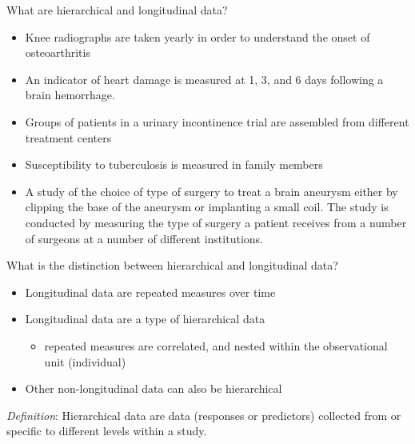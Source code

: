 \documentclass[
  ignorenonframetext,
]{beamer}
\providecommand{\tightlist}{%
  \setlength{\itemsep}{0pt}\setlength{\parskip}{0pt}}
\begin{document}
\begin{frame}{What are hierarchical and longitudinal data?}
\protect\hypertarget{what-are-hierarchical-and-longitudinal-data}{}

\begin{itemize}
\tightlist
\item
  Knee radiographs are taken yearly in order to understand the onset of
  osteoarthritis
\item
  An indicator of heart damage is measured at 1, 3, and 6 days following
  a brain hemorrhage.
\item
  Groups of patients in a urinary incontinence trial are assembled from
  different treatment centers
\item
  Susceptibility to tuberculosis is measured in family members
\item
  A study of the choice of type of surgery to treat a brain aneurysm
  either by clipping the base of the aneurysm or implanting a small
  coil. The study is conducted by measuring the type of surgery a
  patient receives from a number of surgeons at a number of different
  institutions.
\end{itemize}

\end{frame}

\begin{frame}{What is the distinction between hierarchical and
longitudinal data?}
\protect\hypertarget{what-is-the-distinction-between-hierarchical-and-longitudinal-data}{}

\begin{itemize}
\tightlist
\item
  Longitudinal data are repeated measures over time
\item
  Longitudinal data are a type of hierarchical data

  \begin{itemize}
  \tightlist
  \item
    repeated measures are correlated, and nested within the
    observational unit (individual)
  \end{itemize}
\item
  Other non-longitudinal data can also be hierarchical
\end{itemize}

\emph{Definition}: Hierarchical data are data (responses or predictors)
collected from or specific to different levels within a study.

\end{frame}
\end{document}
